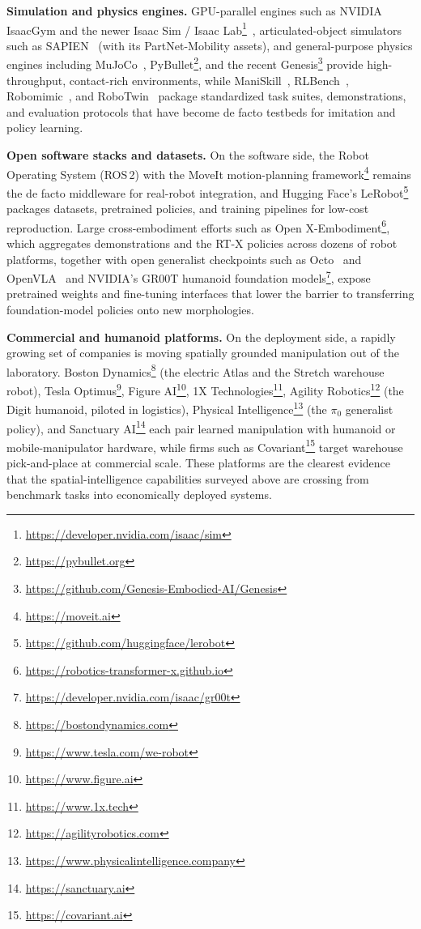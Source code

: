 \textbf{Simulation and physics engines.} GPU-parallel engines such as NVIDIA IsaacGym and the newer Isaac Sim / Isaac Lab\footnote{\url{https://developer.nvidia.com/isaac/sim}}~\cite{makoviychuk2021isaac}, articulated-object simulators such as SAPIEN~\cite{xiang2020sapien} (with its PartNet-Mobility assets), and general-purpose physics engines including MuJoCo~\cite{todorov2012mujoco}, PyBullet\footnote{\url{https://pybullet.org}}, and the recent Genesis\footnote{\url{https://github.com/Genesis-Embodied-AI/Genesis}} provide high-throughput, contact-rich environments, while ManiSkill~\cite{mu2021maniskill}, RLBench~\cite{james2020rlbench}, Robomimic~\cite{robomimic2021}, and RoboTwin~\cite{mu2024robotwin} package standardized task suites, demonstrations, and evaluation protocols that have become de facto testbeds for imitation and policy learning.

\textbf{Open software stacks and datasets.} On the software side, the Robot Operating System (ROS\,2) with the MoveIt motion-planning framework\footnote{\url{https://moveit.ai}} remains the de facto middleware for real-robot integration, and Hugging Face's LeRobot\footnote{\url{https://github.com/huggingface/lerobot}} packages datasets, pretrained policies, and training pipelines for low-cost reproduction. Large cross-embodiment efforts such as Open X-Embodiment\footnote{\url{https://robotics-transformer-x.github.io}}, which aggregates demonstrations and the RT-X policies across dozens of robot platforms, together with open generalist checkpoints such as Octo~\cite{team2024octo} and OpenVLA~\cite{kim2024openvla} and NVIDIA's GR00T humanoid foundation models\footnote{\url{https://developer.nvidia.com/isaac/gr00t}}, expose pretrained weights and fine-tuning interfaces that lower the barrier to transferring foundation-model policies onto new morphologies.

\textbf{Commercial and humanoid platforms.} On the deployment side, a rapidly growing set of companies is moving spatially grounded manipulation out of the laboratory. Boston Dynamics\footnote{\url{https://bostondynamics.com}} (the electric Atlas and the Stretch warehouse robot), Tesla Optimus\footnote{\url{https://www.tesla.com/we-robot}}, Figure AI\footnote{\url{https://www.figure.ai}}, 1X Technologies\footnote{\url{https://www.1x.tech}}, Agility Robotics\footnote{\url{https://agilityrobotics.com}} (the Digit humanoid, piloted in logistics), Physical Intelligence\footnote{\url{https://www.physicalintelligence.company}} (the $\pi_0$ generalist policy), and Sanctuary AI\footnote{\url{https://sanctuary.ai}} each pair learned manipulation with humanoid or mobile-manipulator hardware, while firms such as Covariant\footnote{\url{https://covariant.ai}} target warehouse pick-and-place at commercial scale. These platforms are the clearest evidence that the spatial-intelligence capabilities surveyed above are crossing from benchmark tasks into economically deployed systems.

